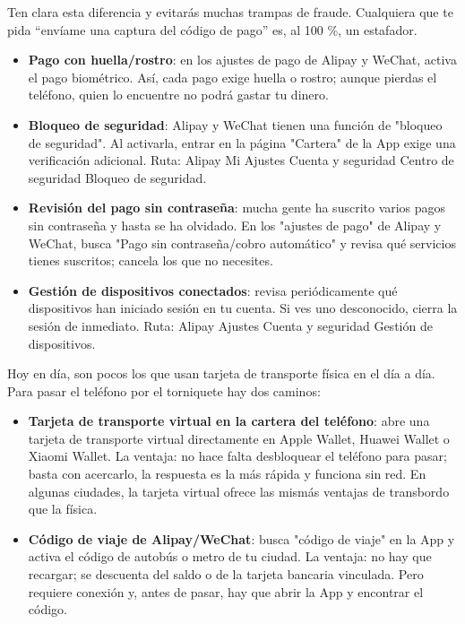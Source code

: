 Ten clara esta diferencia y evitarás muchas trampas de fraude. Cualquiera que te pida “envíame una captura del código de pago” es, al 100 \%, un estafador.


\begin{itemize}
  \item \textbf{Pago con huella/rostro}: en los ajustes de pago de Alipay y WeChat, activa el pago biométrico. Así, cada pago exige huella o rostro; aunque pierdas el teléfono, quien lo encuentre no podrá gastar tu dinero.
  \item \textbf{Bloqueo de seguridad}: Alipay y WeChat tienen una función de "bloqueo de seguridad". Al activarla, entrar en la página "Cartera" de la App exige una verificación adicional. Ruta: Alipay Mi Ajustes Cuenta y seguridad Centro de seguridad Bloqueo de seguridad.
  \item \textbf{Revisión del pago sin contraseña}: mucha gente ha suscrito varios pagos sin contraseña y hasta se ha olvidado. En los "ajustes de pago" de Alipay y WeChat, busca "Pago sin contraseña/cobro automático" y revisa qué servicios tienes suscritos; cancela los que no necesites.
  \item \textbf{Gestión de dispositivos conectados}: revisa periódicamente qué dispositivos han iniciado sesión en tu cuenta. Si ves uno desconocido, cierra la sesión de inmediato. Ruta: Alipay Ajustes Cuenta y seguridad Gestión de dispositivos.
\end{itemize}


Hoy en día, son pocos los que usan tarjeta de transporte física en el día a día. Para pasar el teléfono por el torniquete hay dos caminos:

\begin{itemize}
  \item \textbf{Tarjeta de transporte virtual en la cartera del teléfono}: abre una tarjeta de transporte virtual directamente en Apple Wallet, Huawei Wallet o Xiaomi Wallet. La ventaja: no hace falta desbloquear el teléfono para pasar; basta con acercarlo, la respuesta es la más rápida y funciona sin red. En algunas ciudades, la tarjeta virtual ofrece las mismás ventajas de transbordo que la física.
  \item \textbf{Código de viaje de Alipay/WeChat}: busca "código de viaje" en la App y activa el código de autobús o metro de tu ciudad. La ventaja: no hay que recargar; se descuenta del saldo o de la tarjeta bancaria vinculada. Pero requiere conexión y, antes de pasar, hay que abrir la App y encontrar el código.
\end{itemize}

